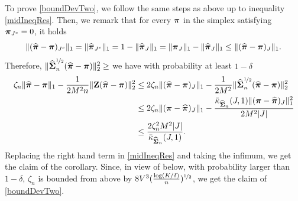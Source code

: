 To prove \eqref{boundDevTwo}, we follow the same steps as above up to inequality \eqref{midIneqRes}.
Then, we remark that for every $\boldsymbol \pi$ in the simplex satisfying $\boldsymbol \pi_{J^c}=0$, it holds
\begin{equation}\label{inqCone}
\|(\widehat{\boldsymbol \pi}-\boldsymbol \pi)_{J^c}\|_1= \|\widehat{\boldsymbol \pi}_{J^c}\|_1 = 1-\|\widehat{\boldsymbol \pi}_{J}\|_1 =
\|\boldsymbol \pi_{J}\|_1-\|\widehat{\boldsymbol \pi}_{J}\|_1\le \|(\widehat{\boldsymbol \pi}-\boldsymbol \pi)_{J}\|_1.
\end{equation}
Therefore, $\|\widehat{\boldsymbol\Sigma}_n^{\nicefrac12}(\widehat{\boldsymbol \pi}-\boldsymbol \pi)\|_2^2\ge $ we have with probability at least $1-\delta$
\begin{align}
\zeta_n\| \widehat{\boldsymbol \pi} - \boldsymbol \pi\|_1 -\frac{1}{2M^2n}\|\mathbf Z(\widehat{\boldsymbol \pi}-\boldsymbol \pi)\|_2^2
&\leq 2\zeta_n\| (\widehat{\boldsymbol \pi}-\boldsymbol \pi)_J\|_1-\frac{1}{2M^2}\|\widehat{\boldsymbol\Sigma}_n^{\nicefrac12}(\widehat{\boldsymbol \pi}-\boldsymbol \pi)\|_2^2\\
&\leq 2\zeta_n\| (\boldsymbol \pi-\widehat{\boldsymbol \pi})_J\|_1 - \frac{\bar\kappa_{\widehat{\boldsymbol\Sigma}_n}(J,1)\| (\boldsymbol \pi-\widehat{\boldsymbol \pi})_J\|_1^2}{2M^2|J|}\\
&\leq \frac{2\zeta_n^2M^2|J|}{\bar\kappa_{\widehat{\boldsymbol\Sigma}_n}(J,1)}.\label{ineqa}
\end{align}
Replacing the right hand term in \eqref{midIneqRes} and taking the infimum, we get
the claim of the corollary. Since, in view of  below, with probability
larger than $1-\delta$, $\zeta_n$ is bounded from above by
$8V^3(\frac{\log(K/\delta)}{n})^{\nicefrac12}$, we get the claim of \eqref{boundDevTwo}.


